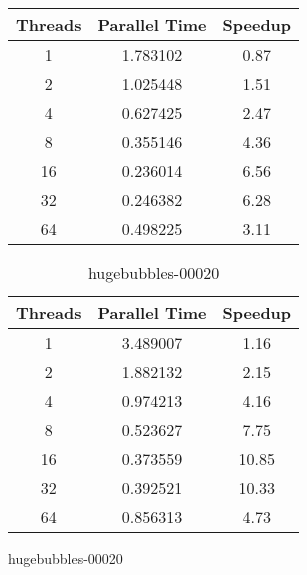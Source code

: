 \documentclass{article}
\begin{document}
\begin{figure}[H]
\begin{minipage}{0.45\textwidth}
        \begin{table}[H]
\begin{center}
    \begin{tabular}{|c|c|c|}
        \hline
         Threads & Parallel Time & Speedup \\
         \hline
         1 & 1.783102 & 0.87 \\
         2 & 1.025448 & 1.51 \\
         4 & 0.627425 & 2.47 \\
         8 & 0.355146 & 4.36 \\
         16 & 0.236014 & 6.56 \\
         32 & 0.246382 & 6.28 \\
         64 & 0.498225 & 3.11 \\
        \hline
    \end{tabular}
\end{center}
        \end{table}
    \end{minipage}
    \begin{minipage}{0.45\textwidth}
    \begin{table}[H]
\begin{center}
        \begin{tabular}{|c|c|c|}
            \hline
             Threads & Parallel Time & Speedup \\
             \hline
             1 & 3.489007 & 1.16 \\
             2 & 1.882132 & 2.15 \\
             4 & 0.974213 & 4.16 \\
             8 & 0.523627 & 7.75 \\
             16 & 0.373559 & 10.85 \\
             32 & 0.392521 & 10.33 \\
             64 & 0.856313 & 4.73 \\
            \hline
        \end{tabular}
\end{center}
\caption{hugebubbles-00020}
    \end{table}
\end{minipage}
\end{figure}
\end{document}
